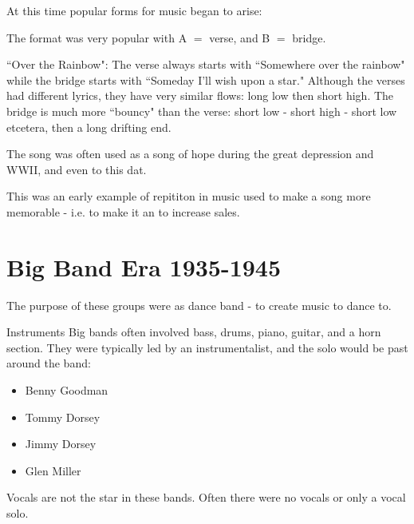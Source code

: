 \documentclass[12pt, a4paper, twoside, openright, titlepage]{book}
\begin{document}
\begin{rmk}{}{}
    At this time popular forms for music began to arise:
\end{rmk}
\begin{eg}{}{}
    The  format was very popular with A $=$ verse, and B $=$ bridge. 
    \begin{eg}{}{}
        ``Over the Rainbow": The verse always starts with ``Somewhere over the rainbow" while the bridge starts with ``Someday I'll wish upon a star." Although the verses had different lyrics, they have very similar flows: long low then short high. The bridge is much more ``bouncy" than the verse: short low - short high - short low etcetera, then a long drifting end.

        The song was often used as a song of hope during the great depression and WWII, and even to this dat.
    \end{eg}
\end{eg}

This was an early example of repititon in music used to make a song more memorable - i.e. to make it an  to increase sales.

\section{Big Band Era 1935-1945}

\begin{rmk}{}{}
    The purpose of these groups were as dance band - to create music to dance to.
\end{rmk}

\begin{defn}{Instruments}{}
    Big bands often involved bass, drums, piano, guitar, and a horn section. They were typically led by an instrumentalist, and the solo would be past around the band: \begin{eg}{}{}
        \leavevmode
        \begin{itemize}
            \item Benny Goodman
            \item Tommy Dorsey
            \item Jimmy Dorsey
            \item Glen Miller
        \end{itemize}
    \end{eg}
\end{defn}

\begin{note}{}{}
    Vocals are not the star in these bands. Often there were no vocals or only a vocal solo.
\end{note}
\end{document}

